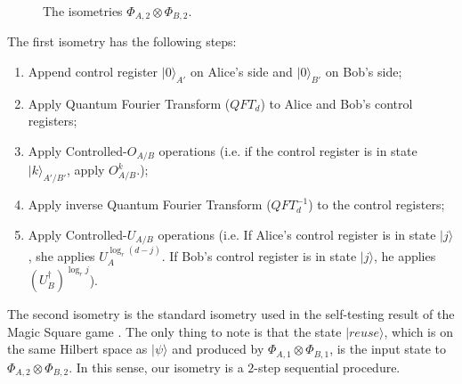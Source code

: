 \documentclass[11pt,letterpaper]{article}
\newcommand{\ket}[1]{|#1\rangle}
\newcommand{\x}{\otimes}
\newcommand{\ct}{^{\dagger}}
\newcommand{\1}{\mathbb{1}}
\newcommand{\EPR}[1]{\Sigma^{(#1)}}
\theoremstyle{definition}
\begin{document}
\begin{figure}[H]
	\caption{The isometries $\Phi_{A,2} \x \Phi_{B,2}$.}
\end{figure}

The first isometry has the following steps:
\begin{enumerate}
	\item Append control register $\ket{0}_{A'}$ on Alice's side and $\ket{0}_{B'}$ on Bob's side;
	\item Apply Quantum Fourier Transform ($QFT_d$) to Alice and Bob's control registers;
	\item Apply Controlled-$O_{A/B}$ operations (i.e. if the control register is in state $\ket{k}_{A'/ B'}$, apply
	$O_{A/B}^k$.);
	\item Apply inverse Quantum Fourier Transform ($QFT_d^{-1}$) to the control registers;
	\item Apply Controlled-$U_{A/B}$ operations (i.e. If Alice's control register is in state $\ket{j}$, she applies
	$U_A^{\log_r (d-j)}$. If Bob's control register is in state $\ket{j}$, he applies $(U_B\ct)^{\log_r j}$).
\end{enumerate}
The second isometry is the standard isometry used in the self-testing result of the Magic Square game \cite{wu2016}.
The only thing to note is that the state $\ket{reuse}$, which is on the same Hilbert space as $\ket{\psi}$ and produced by $\Phi_{A,1} \x \Phi_{B,1}$, is the input state to $\Phi_{A,2} \x \Phi_{B,2}$. In this sense, our isometry is a $2$-step sequential procedure.
\end{document}
